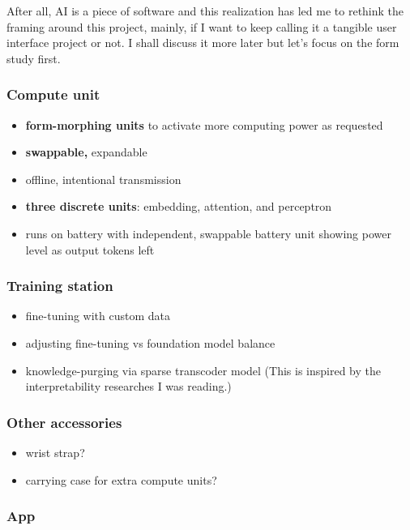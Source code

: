 \documentclass[12pt]{article}
\begin{document}
After all, AI is a piece of software and this realization has led me to rethink the framing around this project, mainly, if I want to keep calling it a tangible user interface project or not. I shall discuss it more later but let's focus on the form study first.

\subsubsection*{Compute unit}

\begin{itemize}
    \item \textbf{form-morphing units} to activate more computing power as requested
    \item \textbf{swappable,} expandable
    \item offline, intentional transmission
    \item \textbf{three discrete units}: embedding, attention, and perceptron
    \item runs on battery with independent, swappable battery unit showing power level as output tokens left
\end{itemize}

\subsubsection*{Training station}

\begin{itemize}
    \item fine-tuning with custom data
    \item adjusting fine-tuning vs foundation model balance
    \item knowledge-purging via sparse transcoder model (This is inspired by the interpretability researches I was reading.)
\end{itemize}

\subsubsection*{Other accessories}

\begin{itemize}
    \item wrist strap?
    \item carrying case for extra compute units?
\end{itemize}

\subsubsection*{App}
\end{document}
